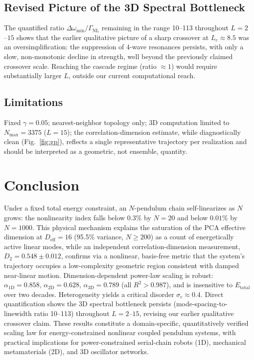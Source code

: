 \documentclass[aps,pre,12pt]{revtex4-2}
\begin{document}
\subsection{Revised Picture of the 3D Spectral Bottleneck}
The quantified ratio $\Delta\omega_{\min}/\Gamma_{\text{NL}}$ remaining in the range 10--113 throughout $L=2$--$15$ shows that the earlier qualitative picture of a sharp crossover at $L_c\approx8.5$ was an oversimplification: the suppression of 4-wave resonances persists, with only a slow, non-monotonic decline in strength, well beyond the previously claimed crossover scale. Reaching the cascade regime (ratio $\approx1$) would require substantially larger $L$, outside our current computational reach.

\subsection{Limitations}
Fixed $\gamma=0.05$; nearest-neighbor topology only; 3D computation limited to $N_{\max}=3375$ ($L=15$); the correlation-dimension estimate, while diagnostically clean (Fig.~\ref{fig:gp}), reflects a single representative trajectory per realization and should be interpreted as a geometric, not ensemble, quantity.

\section{Conclusion}

Under a fixed total energy constraint, an $N$-pendulum chain self-linearizes as $N$ grows: the nonlinearity index falls below $0.3\%$ by $N=20$ and below $0.01\%$ by $N=1000$. This physical mechanism explains the saturation of the PCA effective dimension at $D_{\text{eff}}=16$ (95.5\% variance, $N\ge200$) as a count of energetically active linear modes, while an independent correlation-dimension measurement, $D_2=0.548\pm0.012$, confirms via a nonlinear, basis-free metric that the system's trajectory occupies a low-complexity geometric region consistent with damped near-linear motion. Dimension-dependent power-law scaling is robust: $\alpha_{1\text{D}}=0.858$, $\alpha_{2\text{D}}=0.628$, $\alpha_{3\text{D}}=0.789$ (all $R^2>0.987$), and is insensitive to $E_{\text{total}}$ over two decades. Heterogeneity yields a critical disorder $\sigma_c\approx0.4$. Direct quantification shows the 3D spectral bottleneck persists (mode-spacing-to-linewidth ratio 10--113) throughout $L=2$--$15$, revising our earlier qualitative crossover claim. These results constitute a domain-specific, quantitatively verified scaling law for energy-constrained nonlinear coupled pendulum systems, with practical implications for power-constrained serial-chain robots (1D), mechanical metamaterials (2D), and 3D oscillator networks.
\end{document}
